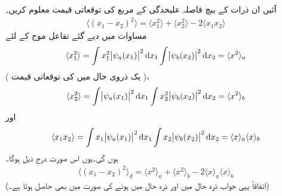 آئیں ان ذرات کے بیچ فاصلہ  علیحدگی  کے مربع کی توقعاتی قیمت معلوم کریں۔
\begin{align}
	\langle(x_1-x_2)^2\rangle=\langle x^2_1\rangle+\langle x_2^2\rangle-2\langle x_1x_2\rangle
\end{align}
 مساوات   میں دیے گئے  تفاعل موج کے لئے
\begin{align*}
	\langle x_1^2\rangle=\int x_1^2\abs{\psi_a(x_1)}^2\dif x_1\int\abs{\psi_b(x_2)}^2\dif x_2=\langle x^2\rangle_a
\end{align*}
 ( یک ذروی حال  میں  کی توقعاتی قیمت )، 
\begin{align*}
	\langle x_2^2\rangle=\int\abs{\psi_a(x_1)}^2\dif x_1\int x_2^2\abs{\psi_b(x_2)}^2\dif x_2=\langle x^2\rangle_b
\end{align*}
اور
\begin{align*}
	\langle x_1x_2 \rangle=\int x_1\abs{\psi_a(x_1)}^2\dif x_1\int x_2\abs{\psi_b(x_2)}^2\dif x_2=\langle x\rangle_a\langle x \rangle_b
\end{align*}
ہوں گی۔یوں اس صورت درج ذیل ہوگا۔
\begin{align}\label{مساوات_متماثل_قابل_ممیز_فاصلہ}
	\langle(x_1-x_2)^2\rangle_{d}=\langle x^2\rangle_a+\langle x^2 \rangle_b-2\langle x \rangle_a\langle x \rangle_b
\end{align}
(اتفاقاً یہی جواب ذرہ  حال  میں اور ذرہ  حال  میں ہونے کی صورت میں بھی حاصل ہوتا ہے۔)

